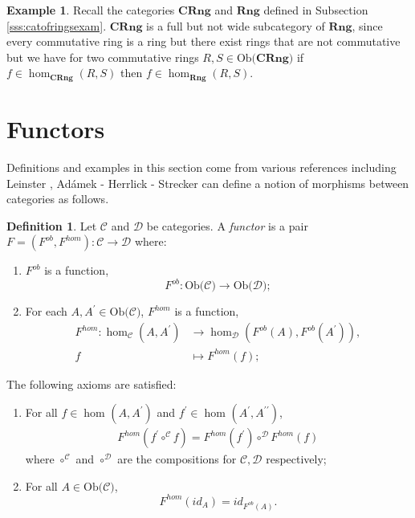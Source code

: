 \documentclass[11pt,a4paper]{article}
\theoremstyle{definition}
\newtheorem{definition}[thm]{Definition}
\newtheorem{example}[thm]{Example}
\newcommand\ho[3][]{\hom_{#1}(#2,#3)}
\newcommand\ob[1]{\mathrm{Ob(}#1\mathrm{)}}
\newcommand\cat[1]{\mathscr{#1}}
\numberwithin{equation}{section}
\begin{document}
\begin{example}
    Recall the categories $\mathbf{CRng}$ and $\mathbf{Rng}$ defined in Subsection \ref{sss:catofringsexam}. $\mathbf{CRng}$ is a full but not wide subcategory of $\mathbf{Rng}$, since every commutative ring is a ring but there exist rings that are not commutative but we have for two commutative rings $R,S\in\ob{\mathbf{CRng}}$ if $f\in\ho[\mathbf{CRng}]{R}{S}$ then $f\in\ho[\mathbf{Rng}]{R}{S}$.
\end{example}

\pagebreak
\section{Functors}
\label{s:functors}
Definitions and examples in this section come from various references including Leinster \cite{Leinster}, Adámek - Herrlick - Strecker \cite{ACC} can define a notion of morphisms between categories as follows.
\begin{definition}
\label{def:functor}
Let $\mathscr{C}$ and $\mathscr{D}$ be categories. A \emph{functor} is a pair
$F=(F^{ob},F^{hom})\colon \mathscr{C}\rightarrow\mathscr{D}$ where:
\begin{enumerate}
    \item $F^{ob}$ is a function,
    \[F^{ob}\colon \ob{\mathscr{C}}\rightarrow\ob{\mathscr{D}};\]
    \item For each $A,A^{\prime}\in\ob{\mathscr{C}}$, $F^{hom}$ is a function,
    \begin{align*}
        F^{hom}\colon \ho[\cat{C}]{A}{A^{\prime}} &\rightarrow\ho[\cat{D}]{F^{ob}(A)}{F^{ob}(A^{\prime})},\\
        f&\mapsto F^{hom}(f);
    \end{align*}
    \end{enumerate}
    The following axioms are satisfied:
    \begin{enumerate}
        \item For all $f\in\ho{A}{A^{\prime}}$ and $f^{\prime}\in\ho{A^{\prime}}{A^{\prime\prime}}$, 
        \begin{align*}
            F^{hom}(f^{\prime}\circ^{\mathscr{C}} f) = F^{hom}(f^{\prime})\circ^{\mathscr{D}} F^{hom}(f)
        \end{align*} 
        where $\circ^{\mathscr{C}}$ and $\circ^{\mathscr{D}}$ are the compositions for $\mathscr{C}, \mathscr{D}$ respectively;
        \item For all $A\in\ob{\mathscr{C}}$, 
        \[F^{hom}(id_{A}) = id_{F^{ob}(A)}.\]
    \end{enumerate}
\end{definition}
\end{document}
